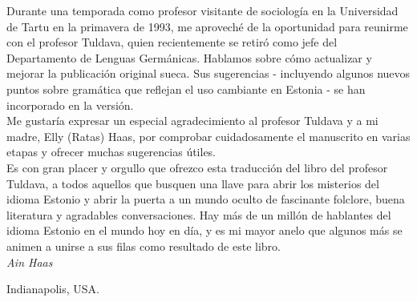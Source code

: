 Durante una temporada como profesor visitante de sociología en la Universidad de Tartu en la primavera de 1993, me aproveché de la oportunidad para reunirme con el profesor Tuldava, quien recientemente se retiró como jefe del Departamento de Lenguas Germánicas. Hablamos sobre cómo actualizar y mejorar la publicación original sueca. Sus sugerencias - incluyendo algunos nuevos puntos sobre gramática que reflejan el uso cambiante en Estonia - se han incorporado en la versión.\\

Me gustaría expresar un especial agradecimiento al profesor Tuldava y a mi madre, Elly (Ratas) Haas, por comprobar cuidadosamente el manuscrito en varias etapas y ofrecer muchas sugerencias útiles.\\

Es con gran placer y orgullo que ofrezco esta traducción del libro del profesor Tuldava, a todos aquellos que busquen una llave para abrir los misterios del idioma Estonio y abrir la puerta a un mundo oculto de fascinante folclore, buena literatura y agradables conversaciones. Hay más de un millón de hablantes del idioma Estonio en el mundo hoy en día, y es mi mayor anelo que algunos más se animen a unirse a sus filas como resultado de este libro.\\

\hfill \textit{Ain Haas}

\hfill Indianapolis, USA.			

\vfill
